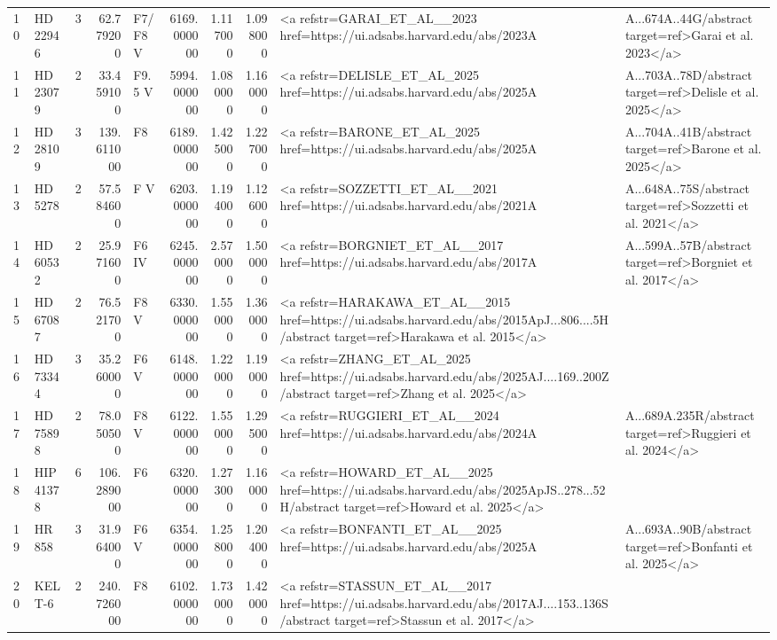 \begin{tabular}{llrrlrrrl}
10 & HD 22946 & 3 & 62.779200 & F7/F8V & 6169.000000 & 1.117000 & 1.098000 & <a refstr=GARAI_ET_AL__2023 href=https://ui.adsabs.harvard.edu/abs/2023A&A...674A..44G/abstract target=ref>Garai et al. 2023</a> \\
11 & HD 23079 & 2 & 33.459100 & F9.5 V & 5994.000000 & 1.080000 & 1.160000 & <a refstr=DELISLE_ET_AL_2025 href=https://ui.adsabs.harvard.edu/abs/2025A&A...703A..78D/abstract target=ref>Delisle et al. 2025</a> \\
12 & HD 28109 & 3 & 139.611000 & F8 & 6189.000000 & 1.425000 & 1.227000 & <a refstr=BARONE_ET_AL_2025 href=https://ui.adsabs.harvard.edu/abs/2025A&A...704A..41B/abstract target=ref>Barone et al. 2025</a> \\
13 & HD 5278 & 2 & 57.584600 & F V & 6203.000000 & 1.194000 & 1.126000 & <a refstr=SOZZETTI_ET_AL__2021 href=https://ui.adsabs.harvard.edu/abs/2021A&A...648A..75S/abstract target=ref>Sozzetti et al. 2021</a> \\
14 & HD 60532 & 2 & 25.971600 & F6 IV & 6245.000000 & 2.570000 & 1.500000 & <a refstr=BORGNIET_ET_AL__2017 href=https://ui.adsabs.harvard.edu/abs/2017A&A...599A..57B/abstract target=ref>Borgniet et al. 2017</a> \\
15 & HD 67087 & 2 & 76.521700 & F8 V & 6330.000000 & 1.550000 & 1.360000 & <a refstr=HARAKAWA_ET_AL__2015 href=https://ui.adsabs.harvard.edu/abs/2015ApJ...806....5H/abstract target=ref>Harakawa et al. 2015</a> \\
16 & HD 73344 & 3 & 35.260000 & F6 V & 6148.000000 & 1.220000 & 1.190000 & <a refstr=ZHANG_ET_AL_2025 href=https://ui.adsabs.harvard.edu/abs/2025AJ....169..200Z/abstract target=ref>Zhang et al. 2025</a> \\
17 & HD 75898 & 2 & 78.050500 & F8 V & 6122.000000 & 1.550000 & 1.295000 & <a refstr=RUGGIERI_ET_AL__2024 href=https://ui.adsabs.harvard.edu/abs/2024A&A...689A.235R/abstract target=ref>Ruggieri et al. 2024</a> \\
18 & HIP 41378 & 6 & 106.289000 & F6 & 6320.000000 & 1.273000 & 1.160000 & <a refstr=HOWARD_ET_AL__2025 href=https://ui.adsabs.harvard.edu/abs/2025ApJS..278...52H/abstract target=ref>Howard et al. 2025</a> \\
19 & HR 858 & 3 & 31.964000 & F6 V & 6354.000000 & 1.258000 & 1.204000 & <a refstr=BONFANTI_ET_AL__2025 href=https://ui.adsabs.harvard.edu/abs/2025A&A...693A..90B/abstract target=ref>Bonfanti et al. 2025</a> \\
20 & KELT-6 & 2 & 240.726000 & F8 & 6102.000000 & 1.730000 & 1.420000 & <a refstr=STASSUN_ET_AL__2017 href=https://ui.adsabs.harvard.edu/abs/2017AJ....153..136S/abstract target=ref>Stassun et al. 2017</a> \\

\end{tabular}
